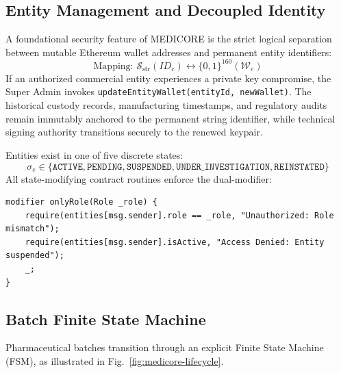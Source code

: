 \documentclass[pdflatex,sn-mathphys-num]{sn-jnl}
\theoremstyle{thmstyleone}
\theoremstyle{thmstyletwo}
\theoremstyle{thmstylethree}
\begin{document}
\subsection{Entity Management and Decoupled Identity}

A foundational security feature of MEDICORE is the strict logical separation between mutable Ethereum wallet addresses and permanent entity identifiers:
\begin{equation}
\text{Mapping: } \mathcal{S}_{\text{str}} (ID_e) \longleftrightarrow \{0,1\}^{160} (\mathcal{W}_e)
\end{equation}
If an authorized commercial entity experiences a private key compromise, the Super Admin invokes \texttt{updateEntityWallet(entityId, newWallet)}. The historical custody records, manufacturing timestamps, and regulatory audits remain immutably anchored to the permanent string identifier, while technical signing authority transitions securely to the renewed keypair.

Entities exist in one of five discrete states:
\begin{equation}
\sigma_e \in \{\texttt{ACTIVE}, \texttt{PENDING}, \texttt{SUSPENDED}, \texttt{UNDER\_INVESTIGATION}, \texttt{REINSTATED}\}
\end{equation}
All state-modifying contract routines enforce the dual-modifier:
\begin{lstlisting}[language=Solidity, basicstyle=\footnotesize\ttfamily, frame=single]
modifier onlyRole(Role _role) {
    require(entities[msg.sender].role == _role, "Unauthorized: Role mismatch");
    require(entities[msg.sender].isActive, "Access Denied: Entity suspended");
    _;
}
\end{lstlisting}

\subsection{Batch Finite State Machine}

Pharmaceutical batches transition through an explicit Finite State Machine (FSM), as illustrated in Fig.~\ref{fig:medicore-lifecycle}.
\end{document}

